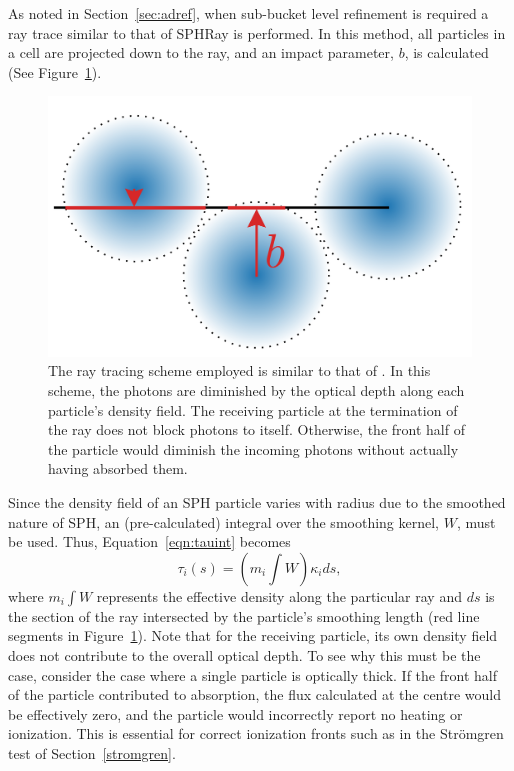 \documentclass[fleq,usenatbib]{mnras}
\newcommand{\strom}{Str\"omgren}
\begin{document}
{As noted in Section~\ref{sec:adref}, when sub-bucket level 
refinement is required a ray trace similar to that of 
SPHRay is performed. In this method, all particles in a cell are projected 
down to the ray, and an impact parameter, $b$, is calculated (See 
Figure~\ref{fig:raytrace}).
\begin{figure}
\includegraphics[width=1\linewidth]{Figures/raytrace.pdf}
\caption{The ray tracing scheme employed is similar to that of 
\protect\cite{altayEt08}. In this scheme, the photons are diminished by the 
optical depth along each particle's density field. The receiving particle at 
the termination of the ray does not block photons to itself. Otherwise, the 
front half of the particle would diminish the incoming photons without 
actually having absorbed them.} 
\label{fig:raytrace}
\end{figure}
Since the density field of an SPH particle varies with radius due to the 
smoothed nature of SPH, an (pre-calculated) integral over the smoothing kernel, $W$, must be 
used. Thus, Equation~\ref{eqn:tauint} becomes 
\begin{equation}
\tau_i(s) = \left(m_i\int W\right) \kappa_i ds,
\end{equation}
where $m_i \int W$ represents the effective density along the particular ray 
and $ds$ is the section of the ray intersected by the particle's smoothing 
length (red line segments in Figure~\ref{fig:raytrace}). Note that for the 
receiving particle, its own density field does not contribute to the overall 
optical depth. To see why this must be the case, consider the case where a 
single particle is optically thick. If the front half of the particle 
contributed to absorption, the flux calculated at the centre would be 
effectively zero, and the particle would incorrectly report no heating or 
ionization.  This is essential for correct ionization fronts such as in the 
\strom{} test of Section~\ref{stromgren}.

}
\end{document}
